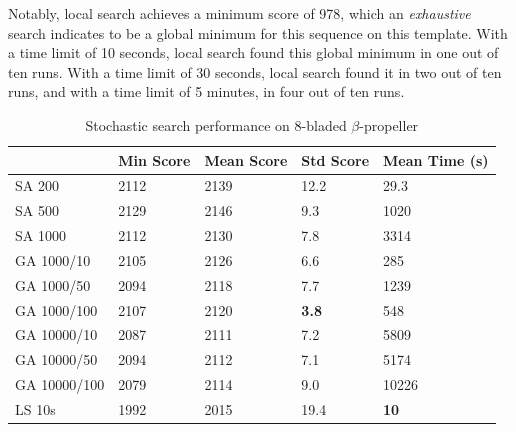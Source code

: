 \documentclass{acm_proc_article-sp}
\begin{document}
Notably, local search achieves a minimum score of 978, which an 
\emph{exhaustive} search indicates to be a global minimum for this sequence on
this template.
With a time limit of 10 seconds, local search found this global minimum in one 
out of ten runs. 
With a time limit of 30 seconds, local search found it in two out of
ten runs, and with a time limit of 5 minutes, in four out of ten runs.


\begin{small}
\begin{center}
\begin{table}[htb]
\caption{Stochastic search performance on 8-bladed $\beta$-propeller \label{ss-propeller}}
\begin{tabular}{lllll}
\hline
             & Min Score & Mean Score & Std Score & Mean Time (s) \\
\hline
SA 200       & 2112      & 2139       & 12.2      & 29.3      \\
\hline                                                        
SA 500       & 2129      & 2146       & 9.3       & 1020      \\
\hline                                                        
SA 1000      & 2112      & 2130       & 7.8      & 3314      \\
\hline                                                        
GA 1000/10   & 2105      & 2126       & 6.6      & 285      \\
\hline                                                        
GA 1000/50   & 2094      & 2118       & 7.7      & 1239      \\
\hline                                                        
GA 1000/100  & 2107      & 2120       & \textbf{3.8}      & 548      \\
\hline                                                        
GA 10000/10  & 2087      & 2111       & 7.2      & 5809      \\
\hline                                                        
GA 10000/50  & 2094      & 2112       & 7.1      & 5174      \\
\hline                                                        
GA 10000/100 & 2079      & 2114       & 9.0      & 10226      \\
\hline                                                        
LS 10s       & 1992     & 2015      & 19.4     & \textbf{10}    \\
\hline                                                        

\end{tabular}
\end{table}
\end{center}
\end{small}
\end{document}
